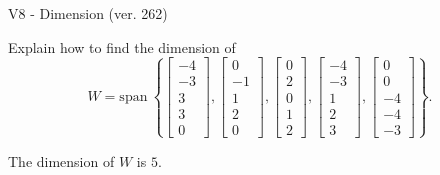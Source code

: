 \begin{exercise}
  \begin{exerciseTitle}V8 - Dimension (ver. 262)\end{exerciseTitle}
  \begin{exerciseStatement}
    Explain how to find the dimension of 
\[W=\mathrm{span}\ \left\{\left[\begin{array}{r}
-4 \\
-3 \\
3 \\
3 \\
0
\end{array}\right] , \left[\begin{array}{r}
0 \\
-1 \\
1 \\
2 \\
0
\end{array}\right] , \left[\begin{array}{r}
0 \\
2 \\
0 \\
1 \\
2
\end{array}\right] , \left[\begin{array}{r}
-4 \\
-3 \\
1 \\
2 \\
3
\end{array}\right] , \left[\begin{array}{r}
0 \\
0 \\
-4 \\
-4 \\
-3
\end{array}\right]\right\}.\]



  \end{exerciseStatement}
  \begin{exerciseAnswer}
   The dimension of \(W\) is  \(5\).
  


  \end{exerciseAnswer}
\end{exercise}